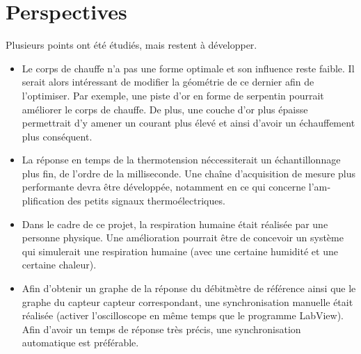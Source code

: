 \newpage
\section{Perspectives}
Plusieurs points ont été étudiés, mais restent à développer. 
\begin{itemize}
      \item Le corps de chauffe n'a pas une forme optimale et son influence reste faible. Il serait alors intéressant de modifier la géométrie de ce
            dernier afin de l'optimiser. Par exemple, une piste d'or en forme de serpentin pourrait améliorer le corps de chauffe.  De plus, une 
            couche d'or plus épaisse permettrait d'y amener un courant plus élevé et ainsi d'avoir un échauffement plus conséquent. 
      \item La réponse en temps de la thermotension néccessiterait un échantillonnage plus fin, de l'ordre de la milliseconde. Une chaîne
            d'acquisition de mesure plus performante devra être développée, notamment en ce qui concerne l'am­plification des petits signaux 
            thermoélectriques.  
      \item Dans le cadre de ce projet, la respiration humaine était réalisée par une personne physique. Une amélioration pourrait être de concevoir
            un système qui simulerait une respiration humaine (avec une certaine humidité et une certaine chaleur). 
      \item Afin d'obtenir un graphe de la réponse du débitmètre de référence ainsi que le graphe du capteur \gls{capteur} correspondant, une
            synchronisation manuelle était réalisée (activer l'oscilloscope en même temps que le programme LabView). Afin d'avoir un temps de réponse très 
            précis, une synchronisation automatique est préférable. 
\end{itemize}

